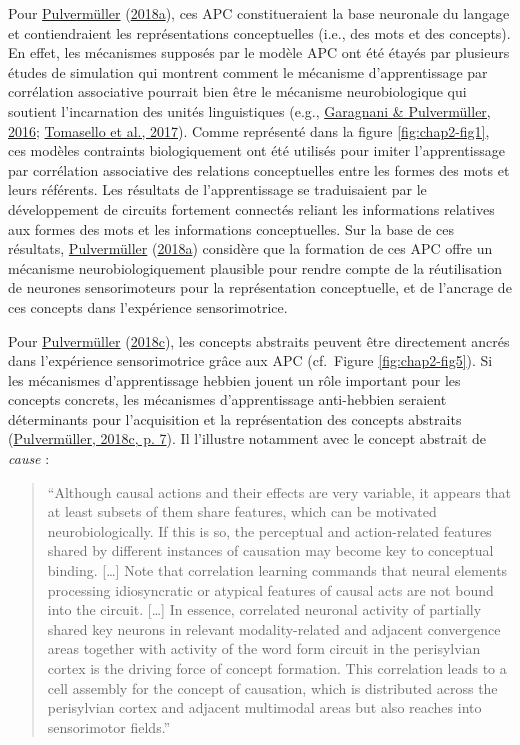 \documentclass[
  a4paper,12pt,twoside,onecolumn,openright,final,oldfontcommands]{memoir}
\begin{document}
Pour \protect\hyperlink{ref-pulvermuller_neural_2018}{Pulvermüller} (\protect\hyperlink{ref-pulvermuller_neural_2018}{2018a}), ces APC constitueraient la base neuronale du langage et contiendraient les représentations conceptuelles (i.e., des mots et des concepts). En effet, les mécanismes supposés par le modèle APC ont été étayés par plusieurs études de simulation qui montrent comment le mécanisme d'apprentissage par corrélation associative pourrait bien être le mécanisme neurobiologique qui soutient l'incarnation des unités linguistiques (e.g., \protect\hyperlink{ref-garagnani_conceptual_2016}{Garagnani \& Pulvermüller, 2016}; \protect\hyperlink{ref-tomasello_brain_2017}{Tomasello et al., 2017}). Comme représenté dans la figure \ref{fig:chap2-fig1}, ces modèles contraints biologiquement ont été utilisés pour imiter l'apprentissage par corrélation associative des relations conceptuelles entre les formes des mots et leurs référents. Les résultats de l'apprentissage se traduisaient par le développement de circuits fortement connectés reliant les informations relatives aux formes des mots et les informations conceptuelles. Sur la base de ces résultats, \protect\hyperlink{ref-pulvermuller_neural_2018}{Pulvermüller} (\protect\hyperlink{ref-pulvermuller_neural_2018}{2018a}) considère que la formation de ces APC offre un mécanisme neurobiologiquement plausible pour rendre compte de la réutilisation de neurones sensorimoteurs pour la représentation conceptuelle, et de l'ancrage de ces concepts dans l'expérience sensorimotrice.

Pour \protect\hyperlink{ref-pulvermuller_case_2018}{Pulvermüller} (\protect\hyperlink{ref-pulvermuller_case_2018}{2018c}), les concepts abstraits peuvent être directement ancrés dans l'expérience sensorimotrice grâce aux APC (cf.~Figure \ref{fig:chap2-fig5}). Si les mécanismes d'apprentissage hebbien jouent un rôle important pour les concepts concrets, les mécanismes d'apprentissage anti-hebbien seraient déterminants pour l'acquisition et la représentation des concepts abstraits (\protect\hyperlink{ref-pulvermuller_case_2018}{Pulvermüller, 2018c, p. 7}). Il l'illustre notamment avec le concept abstrait de \emph{cause} :

\begin{quote}
``Although causal actions and their effects are very variable, it appears that at least subsets of them share features, which can be motivated neurobiologically. If this is so, the perceptual and action-related features shared by different instances of causation may become key to conceptual binding. {[}\ldots{]} Note that correlation learning commands that neural elements processing idiosyncratic or atypical features of causal acts are not bound into the circuit. {[}\ldots{]} In essence, correlated neuronal activity of partially shared key neurons in relevant modality-related and adjacent convergence areas together with activity of the word form circuit in the perisylvian cortex is the driving force of concept formation. This correlation leads to a cell assembly for the concept of causation, which is distributed across the perisylvian cortex and adjacent multimodal areas but also reaches into sensorimotor fields.''
\end{quote}
\end{document}
